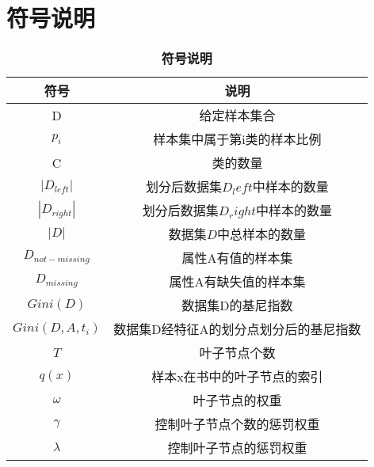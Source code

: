 \renewcommand{\arraystretch}{1.5}
\section{符号说明}
\begin{table}[H]
\caption{\textbf{符号说明}}%
\centering%
\begin{tabular}{cc}%
\toprule%
 符号 &说明\\ 
\midrule%
 D & 给定样本集合 \\
$p_i$ & 样本集中属于第i类的样本比例 \\
  C& 类的数量 \\
  $|D_{left}|$ & 划分后数据集$D_left$中样本的数量 \\
   $|D_{right}|$ & 划分后数据集$D_right$中样本的数量 \\
    $|D|$ & 数据集$D$中总样本的数量 \\
    $D_{not-missing}$&属性A有值的样本集\\
    $D_{missing}$&属性A有缺失值的样本集\\
     $Gini(D)$ & 数据集D的基尼指数 \\
     $Gini(D,A,t_i)$&数据集D经特征A的划分点划分后的基尼指数\\
     $T$&叶子节点个数\\
     $q(x)$&样本x在书中的叶子节点的索引\\
     $\omega$&叶子节点的权重\\
     $\gamma$&控制叶子节点个数的惩罚权重\\
     $\lambda$&控制叶子节点的惩罚权重\\
\bottomrule%
\end{tabular}
\end{table}  
